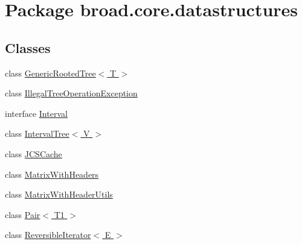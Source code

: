 \hypertarget{namespacebroad_1_1core_1_1datastructures}{\section{Package broad.\+core.\+datastructures}
\label{namespacebroad_1_1core_1_1datastructures}
}
\subsection*{Classes}
\begin{DoxyCompactItemize}
\item 
class \hyperlink{classbroad_1_1core_1_1datastructures_1_1_generic_rooted_tree_3_01_t_01_4}{Generic\+Rooted\+Tree$<$ T $>$}
\item 
class \hyperlink{classbroad_1_1core_1_1datastructures_1_1_illegal_tree_operation_exception}{Illegal\+Tree\+Operation\+Exception}
\item 
interface \hyperlink{interfacebroad_1_1core_1_1datastructures_1_1_interval}{Interval}
\item 
class \hyperlink{classbroad_1_1core_1_1datastructures_1_1_interval_tree_3_01_v_01_4}{Interval\+Tree$<$ V $>$}
\item 
class \hyperlink{classbroad_1_1core_1_1datastructures_1_1_j_c_s_cache}{J\+C\+S\+Cache}
\item 
class \hyperlink{classbroad_1_1core_1_1datastructures_1_1_matrix_with_headers}{Matrix\+With\+Headers}
\item 
class \hyperlink{classbroad_1_1core_1_1datastructures_1_1_matrix_with_header_utils}{Matrix\+With\+Header\+Utils}
\item 
class \hyperlink{classbroad_1_1core_1_1datastructures_1_1_pair_3_01_t1_01_4}{Pair$<$ T1 $>$}
\item 
class \hyperlink{classbroad_1_1core_1_1datastructures_1_1_reversible_iterator_3_01_e_01_4}{Reversible\+Iterator$<$ E $>$}
\end{DoxyCompactItemize}
